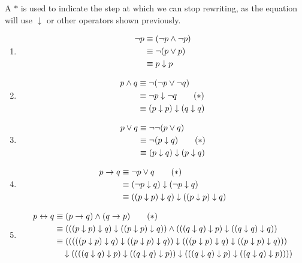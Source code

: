 \begin{solutions}
\setcounter{solutioncounter}{8}
\solution
A $\ast$ is used to indicate the step at which we can stop rewriting, as the equation will use $\downarrow$ or other operators shown previously.
\begin{enumerate}
	\item \begin{align*}
	\lnot p & \equiv (\lnot p \wedge \lnot p)\\
	& \equiv \lnot (p \vee p)\\
	& \equiv p \downarrow p
	\end{align*}
	\item \begin{align*}
	p \wedge q & \equiv \lnot (\lnot p \vee \lnot q)\\
	& \equiv \lnot p \downarrow \lnot q \tag{$\ast$}\\
	& \equiv (p \downarrow p) \downarrow (q \downarrow q)
	\end{align*}
	\item \begin{align*}
	p \vee q & \equiv \lnot \lnot (p \vee q)\\
	& \equiv \lnot (p \downarrow q) \tag{$\ast$}\\
	& \equiv (p \downarrow q) \downarrow (p \downarrow q)
	\end{align*}
	\item \begin{align*}
	p \rightarrow q & \equiv \lnot p \vee q \tag{$\ast$}\\
	& \equiv (\lnot p \downarrow q) \downarrow (\lnot p \downarrow q) \\
	& \equiv ((p \downarrow p) \downarrow q) \downarrow ((p \downarrow p) \downarrow q)
	\end{align*}
	\item \begin{align*}
	p \IFF q & \equiv (p \IMP q) \AND (q \IMP p) \tag{$\ast$}\\
	& \equiv (((p \downarrow p) \downarrow q) \downarrow ((p \downarrow p) \downarrow q)) \AND (((q \downarrow q) \downarrow p) \downarrow ((q \downarrow q) \downarrow q)) \\
	& \equiv (((((p \downarrow p) \downarrow q) \downarrow ((p \downarrow p) \downarrow q)) \downarrow (((p \downarrow p) \downarrow q) \downarrow ((p \downarrow p) \downarrow q))) \notag\\ 
	& \quad \downarrow ((((q \downarrow q) \downarrow p) \downarrow ((q \downarrow q) \downarrow p)) \downarrow (((q \downarrow q) \downarrow p) \downarrow ((q \downarrow q) \downarrow p))))

\end{align*}
\end{enumerate}
\end{solutions}
